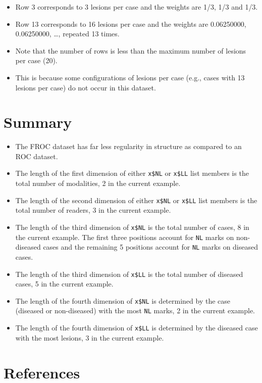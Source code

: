 \documentclass[
]{book}
\providecommand{\tightlist}{%
  \setlength{\itemsep}{0pt}\setlength{\parskip}{0pt}}
\begin{document}
\begin{itemize}
\tightlist
\item
  Row 3 corresponds to 3 lesions per case and the weights are 1/3, 1/3 and 1/3.
\item
  Row 13 corresponds to 16 lesions per case and the weights are 0.06250000, 0.06250000, \ldots, repeated 13 times.
\item
  Note that the number of rows is less than the maximum number of lesions per case (20).
\item
  This is because some configurations of lesions per case (e.g., cases with 13 lesions per case) do not occur in this dataset.
\end{itemize}

\hypertarget{summary}{%
\section{Summary}\label{summary}}

\begin{itemize}
\tightlist
\item
  The FROC dataset has far less regularity in structure as compared to an ROC dataset.
\item
  The length of the first dimension of either \texttt{x\$NL} or \texttt{x\$LL} list members is the total number of modalities, 2 in the current example.
\item
  The length of the second dimension of either \texttt{x\$NL} or \texttt{x\$LL} list members is the total number of readers, 3 in the current example.
\item
  The length of the third dimension of \texttt{x\$NL} is the total number of cases, 8 in the current example. The first three positions account for \texttt{NL} marks on non-diseased cases and the remaining 5 positions account for \texttt{NL} marks on diseased cases.
\item
  The length of the third dimension of \texttt{x\$LL} is the total number of diseased cases, 5 in the current example.
\item
  The length of the fourth dimension of \texttt{x\$NL} is determined by the case (diseased or non-diseased) with the most \texttt{NL} marks, 2 in the current example.
\item
  The length of the fourth dimension of \texttt{x\$LL} is determined by the diseased case with the most lesions, 3 in the current example.
\end{itemize}

\hypertarget{references-2}{%
\section{References}\label{references-2}}
\end{document}
